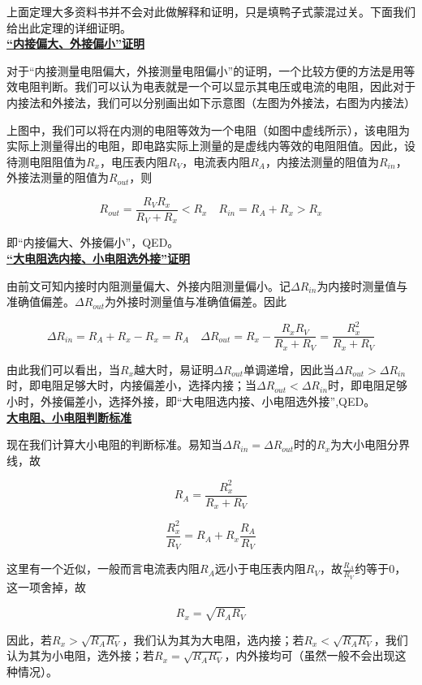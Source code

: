上面定理大多资料书并不会对此做解释和证明，只是填鸭子式蒙混过关。下面我们给出此定理的详细证明。
~\\

\noindent \uline{\textbf{“内接偏大、外接偏小”证明}}

对于“内接测量电阻偏大，外接测量电阻偏小”的证明，一个比较方便的方法是用等效电阻判断。我们可以认为电表就是一个可以显示其电压或电流的电阻，因此对于内接法和外接法，我们可以分别画出如下示意图（左图为外接法，右图为内接法）



上图中，我们可以将在内测的电阻等效为一个电阻（如图中虚线所示），该电阻为实际上测量得出的电阻，即电路实际上测量的是虚线内等效的电阻阻值。因此，设待测电阻阻值为$R_x$，电压表内阻$R_V$，电流表内阻$R_A$，内接法测量的阻值为$R_{in}$，外接法测量的阻值为$R_{out}$，则

$$R_{out} = \frac{R_V R_x}{R_V + R_x} < R_x \quad R_{in} = R_A + R_x > R_x$$

即“内接偏大、外接偏小”，QED。
~\\

\noindent \uline{\textbf{“大电阻选内接、小电阻选外接”证明}}

由前文可知内接时内阻测量偏大、外接内阻测量偏小。记$\Delta R_{in}$为内接时测量值与准确值偏差。$\Delta R_{out}$为外接时测量值与准确值偏差。因此

$$\Delta R_{in} = R_A + R_x - R_x = R_A \quad \Delta R_{out} = R_x - \frac{R_x R_V}{R_x + R_V} = \frac{R_x^2}{R_x + R_V}$$

由此我们可以看出，当$R_x$越大时，易证明$\Delta R_{out}$单调递增，因此当$\Delta R_{out} > \Delta R_{in}$时，即电阻足够大时，内接偏差小，选择内接；当$\Delta R_{out} < \Delta R_{in}$时，即电阻足够小时，外接偏差小，选择外接，即“大电阻选内接、小电阻选外接”,QED。
~\\

\noindent \uline{\textbf{大电阻、小电阻判断标准}}

现在我们计算大小电阻的判断标准。易知当$\Delta R_{in} = \Delta R_{out}$时的$R_x$为大小电阻分界线，故

$$R_A = \frac{R_x^2}{R_x + R_V}$$

$$\frac{R_x^2}{R_V} = R_A + R_x \frac{R_A}{R_V}$$

这里有一个近似，一般而言电流表内阻$R_A$远小于电压表内阻$R_V$，故$\frac{R_A}{R_V}$约等于$0$，这一项舍掉，故

$$R_x = \sqrt{R_A R_V}$$

因此，若$R_x > \sqrt{R_A R_V}$，我们认为其为大电阻，选内接；若$R_x < \sqrt{R_A R_V}$，我们认为其为小电阻，选外接；若$R_x = \sqrt{R_A R_V}$，内外接均可（虽然一般不会出现这种情况）。

